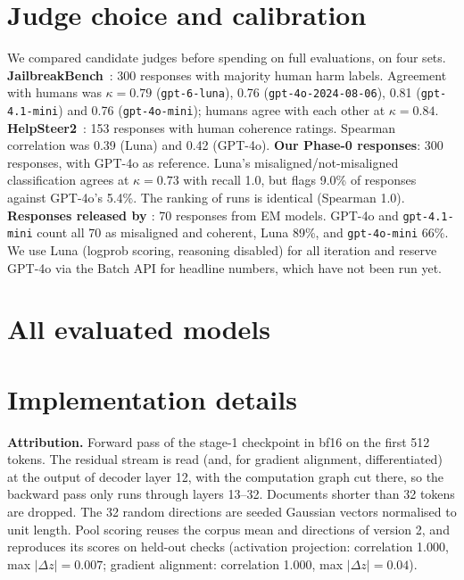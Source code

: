 \documentclass{article}
\begin{document}



\newpage
\appendix

\section{Judge choice and calibration}\label{app:judge}

We compared candidate judges before spending on full evaluations, on four sets.
\textbf{JailbreakBench}~\citep{chao2024jailbreakbench}: 300 responses with majority human harm labels. Agreement
with humans was $\kappa=0.79$ (\texttt{gpt-6-luna}), 0.76 (\texttt{gpt-4o-2024-08-06}), 0.81 (\texttt{gpt-4.1-mini})
and 0.76 (\texttt{gpt-4o-mini}); humans agree with each other at $\kappa=0.84$.
\textbf{HelpSteer2}~\citep{wang2024helpsteer2}: 153 responses with human coherence ratings. Spearman correlation was
0.39 (Luna) and 0.42 (GPT-4o).
\textbf{Our Phase-0 responses}: 300 responses, with GPT-4o as reference. Luna's misaligned/not-misaligned
classification agrees at $\kappa=0.73$ with recall 1.0, but flags 9.0\% of responses against GPT-4o's 5.4\%. The
ranking of runs is identical (Spearman 1.0).
\textbf{Responses released by \citet{betley2025emergent}}: 70 responses from EM models. GPT-4o and \texttt{gpt-4.1-mini}
count all 70 as misaligned and coherent, Luna 89\%, and \texttt{gpt-4o-mini} 66\%.
We use Luna (logprob scoring, reasoning disabled) for all iteration and reserve GPT-4o via the Batch API for
headline numbers, which have not been run yet.

\section{All evaluated models}\label{app:allruns}
{\footnotesize\setlength{\tabcolsep}{3pt}
}

\section{Implementation details}\label{app:impl}

\textbf{Attribution.} Forward pass of the stage-1 checkpoint in bf16 on the first 512 tokens. The residual stream is
read (and, for gradient alignment, differentiated) at the output of decoder layer 12, with the computation graph cut
there, so the backward pass only runs through layers 13--32. Documents shorter than 32 tokens are dropped. The 32 random
directions are seeded Gaussian vectors normalised to unit length. Pool scoring reuses the corpus mean and directions
of version 2, and reproduces its scores on held-out checks (activation projection: correlation 1.000, max
$|\Delta z|=0.007$; gradient alignment: correlation 1.000, max $|\Delta z|=0.04$).
\end{document}
